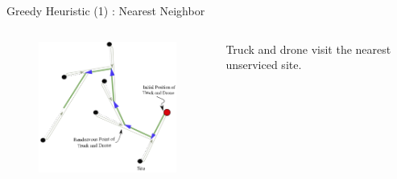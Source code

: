 \documentclass{beamer}
\begin{document}
\begin{frame}{Greedy Heuristic (1) : Nearest Neighbor }

  \begin{columns}
    \begin{column}{0.6\textwidth}
      \begin{figure}[H]
        \centering
        \includegraphics[width=6.6cm]{slide_imgs/nearest_unvisited_neighbor.png}
      \end{figure}
     \end{column}
    
    \begin{column}{0.4\textwidth}
      \begin{center}
        \begin{framed}
          Truck and drone visit the nearest unserviced site. 
        \end{framed}
      \end{center}
    \end{column}
  \end{columns}


  \end{frame}
\end{document}
